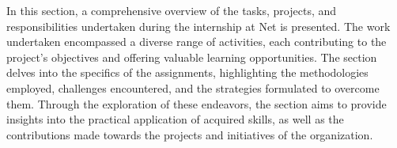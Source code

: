 In this section, a comprehensive overview of the tasks, projects, and responsibilities undertaken during the internship at Net is presented. The work undertaken encompassed a diverse range of activities, each contributing to the project's objectives and offering valuable learning opportunities. The section delves into the specifics of the assignments, highlighting the methodologies employed, challenges encountered, and the strategies formulated to overcome them. Through the exploration of these endeavors, the section aims to provide insights into the practical application of acquired skills, as well as the contributions made towards the projects and initiatives of the organization.





















